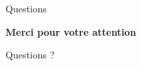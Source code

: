 \documentclass[aspectratio=169]{beamer}
\begin{document}
\begin{frame}{Questions}
  \vspace{0.6cm}
  \begin{center}
    \Large\textbf{Merci pour votre attention}

    \vspace{0.2cm}
    \normalsize\textcolor{cgray}{Questions ?}
  \end{center}
\end{frame}
\end{document}
